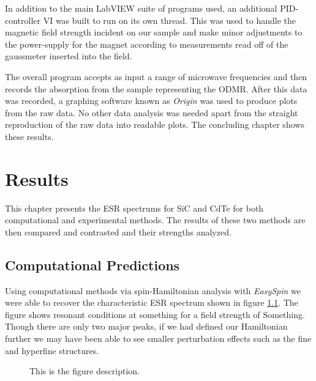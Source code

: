 \documentclass[oneside, astronomy, noacknowlegments]{BYUPhys}
\begin{document}
In addition to the main LabVIEW suite of programs used, an additional PID-controller VI was built to run on its own thread. This was used to handle the magnetic field strength incident on our sample and make minor adjustments to the power-supply for the magnet according to measurements read off of the gaussmeter inserted into the field.

The overall program accepts as input a range of microwave frequencies and then records the absorption from the sample representing the ODMR. After this data was recorded, a graphing software known as \textit{Origin} was used to produce plots from the raw data. No other data analysis was needed apart from the straight reproduction of the raw data into readable plots. The concluding chapter shows these results.










\chapter{Results}

This chapter presents the ESR spectrums for SiC and CdTe for both computational and experimental methods. The results of these two methods are then compared and contrasted and their strengths analyzed.

\section{Computational Predictions}

Using computational methods via spin-Hamiltonian analysis with \textit{EasySpin} we were able to recover the characteristic ESR spectrum shown in figure \ref{fig:SiCModel}. The figure shows resonant conditions at something for a field strength of Something. Though there are only two major peaks, if we had defined our Hamiltonian further we may have been able to see smaller perturbation effects such as the fine and hyperfine structures.

\begin{figure}
    \caption[ESR computational model for SiC]{\label{fig:SiCModel}
     This is the figure description.}
 \end{figure}
\end{document}
